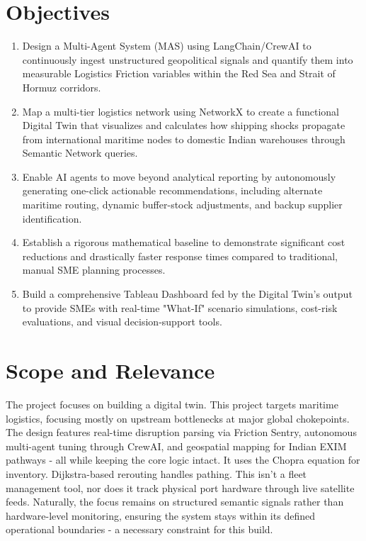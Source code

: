 \section[Objectives]{\textbf{Objectives}}
\begin{enumerate}
\item Design a Multi-Agent System (MAS) using LangChain/CrewAI to continuously ingest unstructured geopolitical signals and quantify them into measurable Logistics Friction variables within the Red Sea and Strait of Hormuz corridors.
\item Map a multi-tier logistics network using NetworkX to create a functional Digital Twin that visualizes and calculates how shipping shocks propagate from international maritime nodes to domestic Indian warehouses through Semantic Network queries.
\item Enable AI agents to move beyond analytical reporting by autonomously generating one-click actionable recommendations, including alternate maritime routing, dynamic buffer-stock adjustments, and backup supplier identification.
\item Establish a rigorous mathematical baseline to demonstrate significant cost reductions and drastically faster response times compared to traditional, manual SME planning processes.
\item Build a comprehensive Tableau Dashboard fed by the Digital Twin's output to provide SMEs with real-time "What-If" scenario simulations, cost-risk evaluations, and visual decision-support tools.
\end{enumerate}

\section[Scope and Relevance]{\textbf{Scope and Relevance}}

The project focuses on building a digital twin. This project targets maritime logistics, focusing mostly on upstream bottlenecks at major global chokepoints. The design features real-time disruption parsing via Friction Sentry, autonomous multi-agent tuning through CrewAI, and geospatial mapping for Indian EXIM pathways - all while keeping the core logic intact. It uses the Chopra equation for inventory. Dijkstra-based rerouting handles pathing. This isn't a fleet management tool, nor does it track physical port hardware through live satellite feeds. Naturally, the focus remains on structured semantic signals rather than hardware-level monitoring, ensuring the system stays within its defined operational boundaries - a necessary constraint for this build. 

